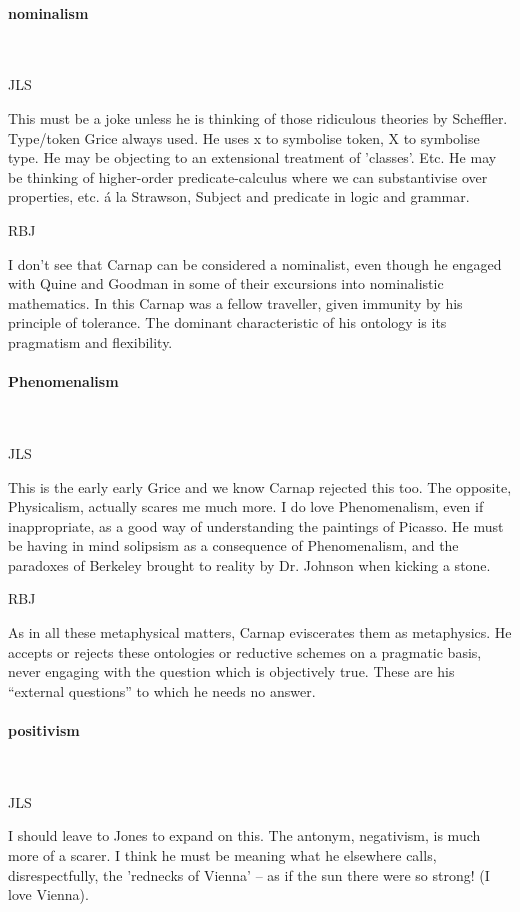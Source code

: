 \documentclass[10pt,titlepage]{book}
\begin{document}
\paragraph{nominalism}\ 

JLS

This must be a joke unless he is thinking of those ridiculous  
theories by Scheffler. Type/token Grice always used. He uses x to symbolise  
token, X to symbolise type. He may be objecting to an extensional treatment 
of  'classes'. Etc. He may be thinking of higher-order predicate-calculus 
where we  can substantivise over properties, etc. \'a la Strawson, Subject and 
predicate in  logic and grammar.

RBJ

I don't see that Carnap can be considered a nominalist, even though he engaged with Quine and Goodman in some of their excursions into nominalistic mathematics.
In this Carnap was a fellow traveller, given immunity by his principle of tolerance.
The dominant characteristic of his ontology is its pragmatism and flexibility.

\paragraph{Phenomenalism}\ 

JLS

This is the early early Grice and we know Carnap rejected  
this too. The opposite, Physicalism, actually scares me much more. I do love  
Phenomenalism, even if inappropriate, as a good way of understanding the  
paintings of Picasso. He must be having in mind solipsism as a consequence of 
 Phenomenalism, and the paradoxes of Berkeley brought to reality by Dr. 
Johnson  when kicking a stone.

RBJ

As in all these metaphysical matters, Carnap eviscerates them as metaphysics.
He accepts or rejects these ontologies or reductive schemes on a pragmatic basis, never engaging with the question which is objectively true.
These are his ``external questions'' to which he needs no answer.

\paragraph{positivism}\ 

JLS

I should leave to Jones to expand on this. The antonym,  
negativism, is much more of a scarer. I think he must be meaning what he  
elsewhere calls, disrespectfully, the 'rednecks of Vienna' -- as if the sun  there 
were so strong! (I love Vienna).
\end{document}
